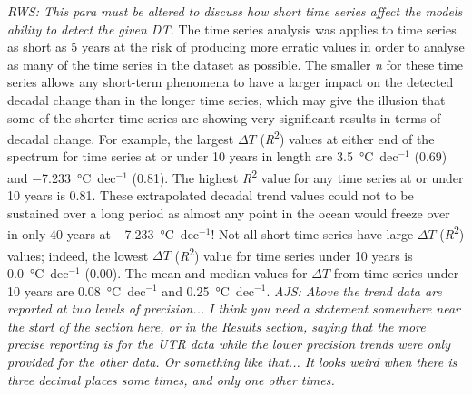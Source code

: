 \documentclass[]{ametsoc}
\begin{document}
\emph{RWS: This para must be altered to discuss how short time series affect the models ability to detect the given DT.}
The time series analysis was applies to time series as short as 5 years at the risk of producing more erratic values in order to analyse as many of the time series in the dataset as possible. The smaller \emph{n} for these time series allows any short-term phenomena to have a larger impact on the detected decadal change than in the longer time series, which may give the illusion that some of the shorter time series are showing very significant results in terms of decadal change. For example, the largest $\Delta T$ (\emph{R}\textsuperscript{2}) values at either end of the spectrum for time series at or under 10 years in length are \SI{3.5}{\degreeCelsius}~dec$^{-1}$ (0.69) and \SI{-7.233}{\degreeCelsius}~dec$^{-1}$ (0.81). The highest \emph{R}\textsuperscript{2} value for any time series at or under 10 years is 0.81. These extrapolated decadal trend values could not to be sustained over a long period as almost any point in the ocean would freeze over in only 40 years at \SI{-7.233}{\degreeCelsius}~dec$^{-1}$! Not all short time series have large $\Delta T$ (\emph{R}\textsuperscript{2}) values; indeed, the lowest $\Delta T$ (\emph{R}\textsuperscript{2}) value for time series under 10 years is \SI{0.0}{\degreeCelsius}~dec$^{-1}$ (0.00). The mean and median values for $\Delta T$ from time series under 10 years are \SI{0.08}{\degreeCelsius}~dec$^{-1}$ and \SI{0.25}{\degreeCelsius}~dec$^{-1}$.
\emph{AJS: Above the trend data are reported at two levels of precision... I think you need a statement somewhere near the start of the section here, or in the Results section, saying that the more precise reporting is for the UTR data while the lower precision trends were only provided for the other data. Or something like that... It looks weird when there is three decimal places some times, and only one other times.}
\end{document}
